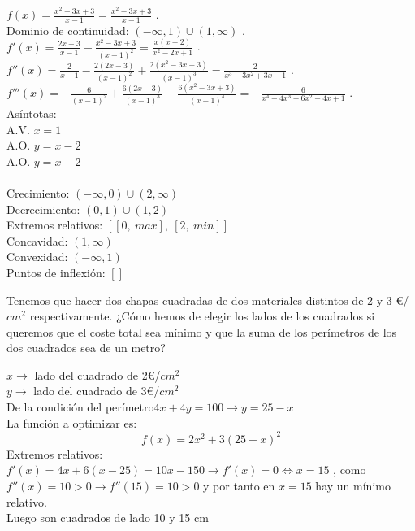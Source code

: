 \documentclass[addpoints,spanish, 12pt,a4paper]{exam}
\begin{document}
\begin{questions}
\begin{solution}
$f(x)=\frac{x^{2} - 3 x + 3}{x - 1}=\frac{x^{2} - 3 x + 3}{x - 1}$ . \\ Dominio de continuidad: $\left(-\infty, 1\right) \cup \left(1, \infty\right)$ . \\ $f'(x)=\frac{2 x - 3}{x - 1} - \frac{x^{2} - 3 x + 3}{\left(x - 1\right)^{2}}=\frac{x \left(x - 2\right)}{x^{2} - 2 x + 1}$ . \\ $f''(x)=\frac{2}{x - 1} - \frac{2 \left(2 x - 3\right)}{\left(x - 1\right)^{2}} + \frac{2 \left(x^{2} - 3 x + 3\right)}{\left(x - 1\right)^{3}}=\frac{2}{x^{3} - 3 x^{2} + 3 x - 1}$ . \\ $f'''(x)=- \frac{6}{\left(x - 1\right)^{2}} + \frac{6 \left(2 x - 3\right)}{\left(x - 1\right)^{3}} - \frac{6 \left(x^{2} - 3 x + 3\right)}{\left(x - 1\right)^{4}}=- \frac{6}{x^{4} - 4 x^{3} + 6 x^{2} - 4 x + 1}$ . \\ Asíntotas:\\A.V. $x=1$\\A.O. $y=x - 2$ \\A.O. $y=x - 2$ \\ \\ Crecimiento: $\left(-\infty, 0\right) \cup \left(2, \infty\right)$ \\ Decrecimiento: $\left(0, 1\right) \cup \left(1, 2\right) $\\ Extremos relativos: $\left[ \left[ 0, \  max\right], \  \left[ 2, \  min\right]\right]$ \\ Concavidad: $\left(1, \infty\right)$ \\ Convexidad: $\left(-\infty, 1\right) $\\ Puntos de inflexión: $\left[ \right]$ \\



\end{solution}

\addpoints



\question[4] Tenemos que hacer dos chapas cuadradas de dos  materiales distintos de 2 y 3 \euro /$cm^2$ respectivamente. ¿Cómo hemos de elegir los lados de los cuadrados si queremos que el coste total sea mínimo y que la suma de los perímetros de los dos cuadrados sea de un metro?

\begin{solution}
$x \to$ lado del cuadrado de 2\euro /$cm^2$ \\
$y \to$ lado del cuadrado de 3\euro /$cm^2$ \\
De la condición del perímetro$4x+4y=100 \to y=25-x$ \\
La función a optimizar es: $$f(x)=2x^2+3(25-x)^2$$
Extremos relativos: \\
$f'(x)=4x+6(x-25)=10x-150 \to f'(x)=0 \iff x=15$
, como $f''(x)=10>0 \to f''(15)=10>0$ y por tanto en $x=15$ hay un mínimo relativo.\\


Luego son cuadrados de lado 10 y 15 cm
\end{solution}

\addpoints


\addpoints




\end{questions}
\end{document}
